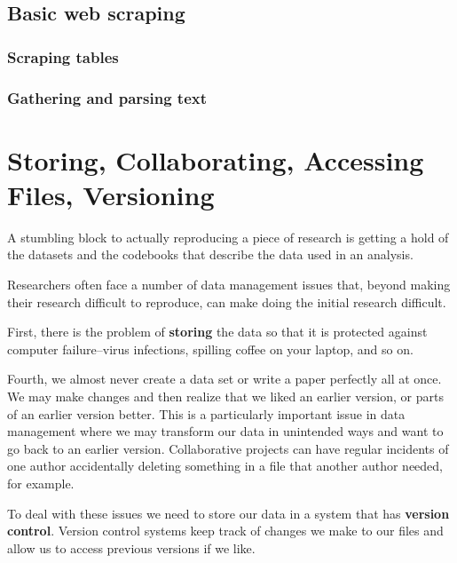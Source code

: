 \documentclass[ChapterTOCs,krantz1]{krantz}\usepackage{graphicx, color}
\begin{document}
\section{Basic web scraping}

\subsection{Scraping tables}

\subsection{Gathering and parsing text}





\chapter{Storing, Collaborating, Accessing Files, Versioning}\label{Storing}

A stumbling block to actually reproducing a piece of research is getting a hold of the datasets and the codebooks that describe the data used in
an analysis.

Researchers often face a number of data management issues that, beyond
making their research difficult to reproduce, can make doing the initial
research difficult.

First, there is the problem of \textbf{storing} the data so that it is
protected against computer failure--virus infections, spilling coffee on
your laptop, and so on.

Fourth, we almost never create a data set or write a paper perfectly all
at once. We may make changes and then realize that we liked an earlier
version, or parts of an earlier version better. This is a particularly
important issue in data management where we may transform our data in
unintended ways and want to go back to an earlier version. Collaborative
projects can have regular incidents of one author accidentally deleting
something in a file that another author needed, for example.

To deal with these issues we need to store our data in a system that has
\textbf{version control}. Version control systems keep track of changes
we make to our files and allow us to access previous versions if we
like.
\end{document}
